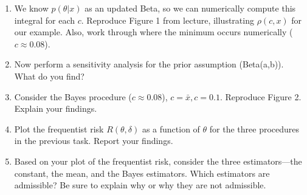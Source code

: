 \documentclass{article}
\begin{document}
\begin{enumerate}
\item We know $p(\theta|x)$ as an updated Beta, so we can numerically compute this integral for each $c$.  Reproduce Figure 1 from lecture, illustrating $\rho(c,x)$ for our example. Also, work through where the minimum occurs numerically (
$c\approx 0.08$).
\item Now perform a sensitivity analysis for the prior assumption (Beta(a,b)). What do you find? 
\item Consider the Bayes procedure ($c\approx 0.08$), $c=\bar{x}, c=0.1.$ Reproduce Figure 2. Explain your findings. 
\item Plot the frequentist risk $R(\theta, \delta)$ as a function of $\theta$ for the three procedures in the previous task. Report your findings. 
\item Based on your plot of the frequentist risk, consider the three estimators---the constant, the mean, and the Bayes estimators. Which estimators are admissible? Be sure to explain why or why they are not admissible. 

\end{enumerate}

%
%
%
%
%
%
\end{document}
